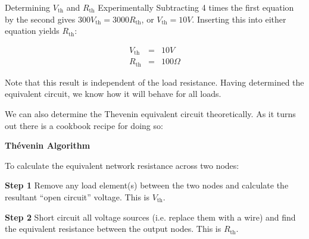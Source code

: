 \documentclass{tufte-book}
\begin{document}
\begin{myexample}[label = ex:det_thev_exp]{Determining $V_\text{th}$ and $R_\text{th}$ Experimentally}
\noindent Subtracting 4 times the first equation by the second gives $300V_\text{th} = 3000R_\text{th}$, or $V_\text{th} = 10V$. Inserting this into either equation yields $R_\text{th}$:


\begin{eqnarray*}
V_\text{th} & = & 10V \\
R_\text{th} & = & 100\Omega
\end{eqnarray*}

\noindent Note that this result is independent of the load resistance. Having determined the equivalent circuit, we know how it will behave for all loads.
\end{myexample}

We can also determine the Thevenin equivalent circuit theoretically. As it turns out there is a cookbook recipe for doing so:

\textbf{Th\'evenin Algorithm}

\noindent To calculate the equivalent network resistance across two nodes:

\noindent\textbf{Step 1} Remove any load element(s) between the two nodes and calculate the resultant ``open circuit'' voltage. This is $V_\text{th}$.

\noindent\textbf{Step 2} Short circuit all voltage sources (i.e. replace them with a wire) and find the equivalent resistance between the output nodes. This is $R_\text{th}$.
\end{document}
